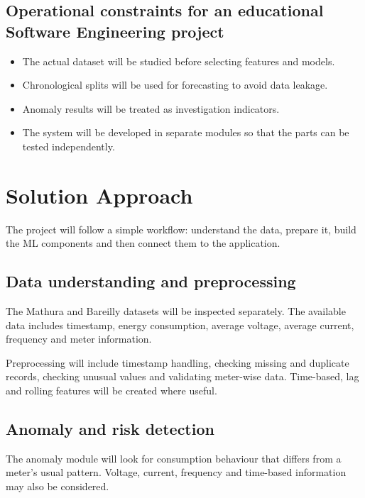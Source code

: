\documentclass[11pt,a4paper]{article}
\begin{document}
\subsection{Operational constraints for an educational Software Engineering project}

\begin{itemize}[leftmargin=0.7cm]

    \item The actual dataset will be studied before selecting
    features and models.

    \item Chronological splits will be used for forecasting to avoid
    data leakage.

    \item Anomaly results will be treated as investigation
    indicators.

    \item The system will be developed in separate modules so that
    the parts can be tested independently.

\end{itemize}

\section{Solution Approach}

The project will follow a simple workflow: understand the data,
prepare it, build the ML components and then connect them to the
application.

\subsection{Data understanding and preprocessing}

The Mathura and Bareilly datasets will be inspected separately. The
available data includes timestamp, energy consumption, average
voltage, average current, frequency and meter information.

Preprocessing will include timestamp handling, checking missing and
duplicate records, checking unusual values and validating meter-wise
data. Time-based, lag and rolling features will be created where
useful.

\subsection{Anomaly and risk detection}

The anomaly module will look for consumption behaviour that differs
from a meter's usual pattern. Voltage, current, frequency and
time-based information may also be considered.
\end{document}
